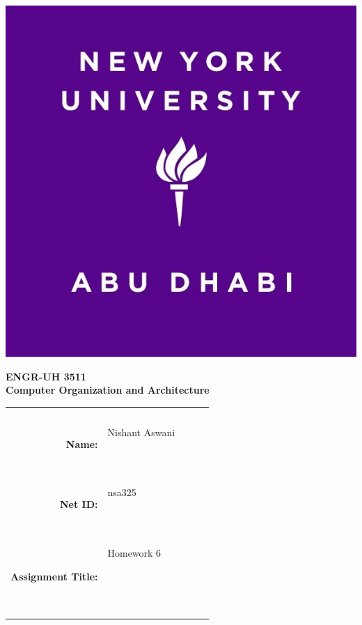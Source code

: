 \documentclass[11pt]{exam}
\newcommand{\myname}{Nishant Aswani}
\newcommand{\mynetid}{nsa325}
\newcommand{\myhwtype}{Homework}
\newcommand{\myhwnum}{6}
\newcommand{\mycoursenumber}{ENGR-UH 3511}
\newcommand{\myclassname}{Computer Organization and Architecture}
\begin{document}
\begin{center}
  \includegraphics[scale=0.15]{etc/NYUAD-alt-logo.jpg}
\end{center}

{\vspace{1.5em}}

\begin{center}
    \Huge{\textbf{\mycoursenumber}}\\
    {\vspace{0.5em}}
    \Huge{\textbf{\myclassname}}
\end{center}

{\vspace{10em}}

\begin{center}
  \begin{tabular}{|rp{5.0cm}lll|}
    \hline
    &  &  &  & \\
    &  &  &  & \\
    \Large{\textbf{Name:}} & \Large{\myname}
    
    \  &  &  & \\
    \Large{\textbf{Net ID:}} & \Large{\mynetid}
    
    \  &  &  & \\
    \Large{\textbf{Assignment Title:}} & \Large{\myhwtype{} \myhwnum}
    
    \
    
    \  &  &  & \\
    \hline
  \end{tabular}
\end{center}
\end{document}
